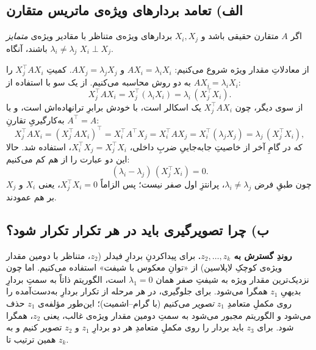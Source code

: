 \documentclass[14pt]{extarticle}
\newcommand{\T}{^{\top}}
\begin{document}
\subsection{الف) تعامد بردارهای ویژه‌ی ماتریس متقارن}

\begin{claimx}
اگر $A$ متقارن حقیقی باشد و $X_i,X_j$ بردارهای ویژه‌ی متناظر با مقادیر ویژه‌ی
\emph{متمایز} $\lambda_i\neq\lambda_j$ باشند، آنگاه $X_i\perp X_j$.
\end{claimx}

\begin{proofx}
از معادلاتِ مقدار ویژه شروع می‌کنیم: $A X_i=\lambda_i X_i$ و $A X_j=\lambda_j X_j$. کمیتِ $X_j\T A X_i$ را به دو روش محاسبه می‌کنیم. از یک سو با استفاده از $A X_i=\lambda_i X_i$:
\[
X_j\T A X_i = X_j\T(\lambda_i X_i)=\lambda_i\,(X_j\T X_i).
\]
از سوی دیگر، چون $X_j\T A X_i$ یک اسکالر است، با خودش برابرِ ترانهاده‌اش است، و با به‌کارگیریِ تقارنِ $A\T=A$:
\[
X_j\T A X_i = (X_j\T A X_i)\T = X_i\T A\T X_j = X_i\T A X_j = X_i\T(\lambda_j X_j)=\lambda_j\,(X_j\T X_i),
\]
که در گامِ آخر از خاصیتِ جابه‌جاییِ ضربِ داخلی، $X_i\T X_j=X_j\T X_i$، استفاده شد. حالا این دو عبارت را از هم کم می‌کنیم:
\[
(\lambda_i-\lambda_j)\,(X_j\T X_i)=0 .
\]
چون طبقِ فرض $\lambda_i\neq\lambda_j$، پرانتزِ اول صفر نیست؛ پس الزاماً $X_j\T X_i=0$، یعنی $X_i$ و $X_j$ بر هم عمودند.
\end{proofx}

\subsection{ب) چرا تصویرگیری باید در هر تکرار تکرار شود؟}

\noindent\textbf{روندِ گسترش به $z_2,\dots,z_k$.}
برای پیداکردنِ بردارِ فیدلر ($z_2$، متناظر با دومین مقدار ویژه‌ی کوچکِ لاپلاسین) از «توانِ معکوس با شیفت» استفاده می‌کنیم. اما چون نزدیک‌ترین مقدار ویژه به شیفتِ صفر همان $\lambda_1=0$ است، الگوریتم ذاتاً به سمتِ بردارِ بدیهیِ $z_1$ همگرا می‌شود. برای جلوگیری، در هر مرحله از تکرار بردارِ به‌دست‌آمده را روی مکملِ متعامدِ $z_1$ \emph{تصویر} می‌کنیم (با گرام--اشمیت)؛ این‌طور مؤلفه‌ی $z_1$ حذف می‌شود و الگوریتم مجبور می‌شود به سمتِ دومین مقدار ویژه‌ی غالب، یعنی $z_2$، همگرا شود. برای $z_3$ باید بردار را روی مکملِ متعامدِ هر دو بردارِ $z_1$ و $z_2$ تصویر کنیم و به همین ترتیب تا $z_k$.
\end{document}
